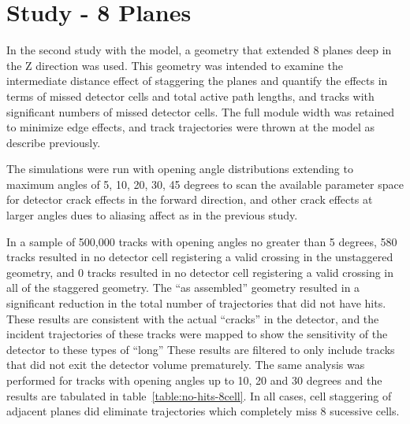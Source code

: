 \section{Study - 8 Planes}

In the second study with the model, a geometry that extended 8 planes deep in the Z direction was used.  This geometry was intended to examine the intermediate distance effect of staggering the planes and quantify the effects in terms of missed detector cells and total active path lengths, and tracks with significant numbers of missed detector cells.  The full module width was retained to minimize edge effects, and track trajectories were thrown at the model as describe previously.

The simulations were run with opening angle distributions extending to maximum angles of 5, 10, 20, 30, 45 degrees to scan the available parameter space for detector crack effects in the forward direction, and other crack effects at larger angles dues to aliasing affect as in the previous study.

In a sample of 500,000 tracks with opening angles no greater than 5 degrees, 580 tracks resulted in no detector cell registering a valid crossing in the unstaggered geometry, and 0 tracks resulted in no detector cell registering a valid crossing in all of the staggered geometry.  The ``as assembled'' geometry resulted in a significant reduction in the total number of trajectories that did not have hits.   These results are consistent with the actual ``cracks'' in the detector, and the incident trajectories of these tracks were mapped to show the sensitivity of the detector to these types of ``long''   These results are filtered to only include tracks that did not exit the detector volume prematurely.  The same analysis was performed for tracks with opening angles up to 10, 20 and 30 degrees and the results are tabulated in table~\ref{table:no-hits-8cell}.  In all cases, cell staggering of adjacent planes did eliminate trajectories which completely miss 8 sucessive cells.

